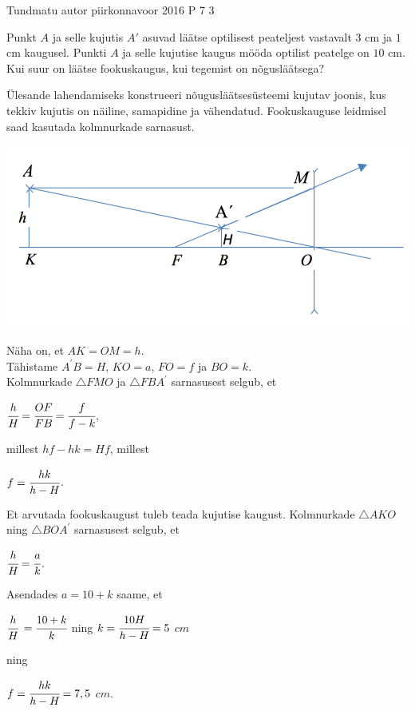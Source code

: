 {Tundmatu autor} %
{piirkonnavoor} %
{2016} %
{P 7} %
{3} %
{
\ifStatement
Punkt $A$ ja selle kujutis $A'$ asuvad läätse optilisest peateljest vastavalt $3$ cm ja $1$ cm kaugusel. Punkti $A$ ja selle kujutise kaugus mööda optilist peatelge on $10$ cm. Kui suur on läätse fookuskaugus, kui tegemist on nõgusläätsega?
\fi

\ifHint
Ülesande lahendamiseks konstrueeri nõugusläätsesüsteemi kujutav joonis, kus tekkiv kujutis on näiline, samapidine ja vähendatud. Fookuskauguse leidmisel saad kasutada kolmnurkade sarnasust.
\fi


\ifSolution
\begin{center}
	\includegraphics[width=0.5\linewidth]{2016-v2p-07-lah.PNG}
\end{center}
Näha on, et $AK = OM = h$. \\
Tähistame $A^\prime B = H$, $KO = a$, $FO = f$ ja $BO = k$. \\
Kolmnurkade $\triangle FMO$ ja $\triangle FBA^\prime$ sarnasusest selgub, et 
\begin{center}
$\cfrac{h}{H} = \cfrac{OF}{FB} = \cfrac{f}{f - k}$,
\end{center}
millest $hf - hk = H f$, millest
\begin{center}
$f = \cfrac{hk}{h - H}$.
\end{center}
Et arvutada fookuskaugust tuleb teada kujutise kaugust. Kolmnurkade $\triangle AKO$ ning $\triangle BOA^\prime$ sarnasusest selgub, et
\begin{center}
$\cfrac{h}{H} = \cfrac{a}{k}$.
\end{center}
Asendades $a = 10 + k$ saame, et
\begin{center}
$\cfrac{h}{H}$ $= \cfrac{10 + k}{k}$ ning $k = \cfrac{10H}{h - H} = 5$ $cm$
\end{center}
ning
\begin{center}
$f = \cfrac{hk}{h - H} = 7,5$ $cm$.
\end{center}
\fi
}